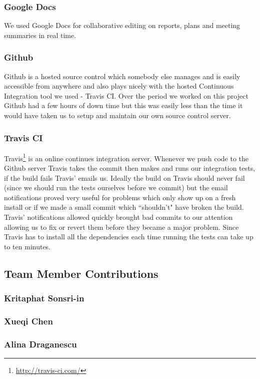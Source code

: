 \documentclass[11pt, a4paper]{article}
\begin{document}
\subsubsection{Google Docs}
We used Google Docs for collaborative editing on reports, plans and meeting summaries in real time.
  
\subsubsection{Github}
Github is a hosted source control which somebody else manages and is easily accessible from anywhere and also plays nicely with the hosted Continuous Integration tool we used - Travis CI.
Over the period we worked on this project Github had a few hours of down time but this was easily less than the time it would have taken us to setup and maintain our own source control server.

\subsubsection{Travis CI}
Travis\footnote{\url{http://travis-ci.com/}} is an online continues integration server.
Whenever we push code to the Github server Travis takes the commit then makes and runs our integration tests, if the build fails Travis' emails us.
Ideally the build on Travis should never fail (since we should run the tests ourselves before we commit) but the email notifications proved very useful for problems which only show up on a fresh install or if we made a small commit which ``shouldn't" have broken the build.
Travis' notifications allowed quickly brought bad commits to our attention allowing us to fix or revert them before they became a major problem.  
Since Travis has to install all the dependencies each time running the tests can take up to ten minutes. 



\subsection{Team Member Contributions}
\subsubsection{Kritaphat Sonsri-in}
\subsubsection{Xueqi Chen}
\subsubsection{Alina Draganescu}
\end{document}
